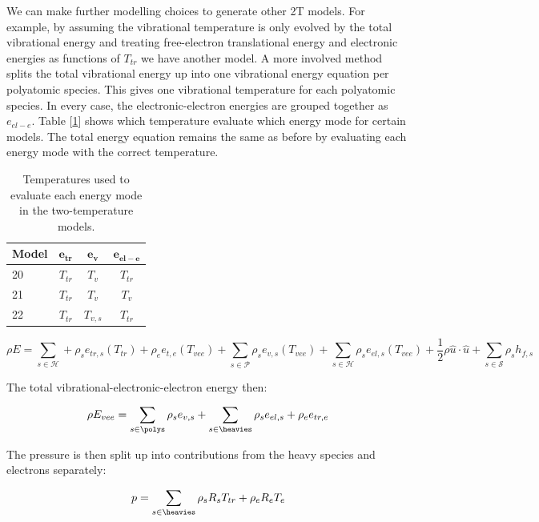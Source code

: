 \documentclass[10pt]{article}
\begin{document}
\begin{flushleft}
We can make further modelling choices to generate other 2T models. For example, by assuming the vibrational temperature is only evolved by the total vibrational energy and treating free-electron translational energy and electronic energies as functions of $T_{tr}$ we have another model. A more involved method splits the total vibrational energy up into one vibrational energy equation per polyatomic species. This gives one vibrational temperature for each polyatomic species. In every case, the electronic-electron energies are grouped together as $e_{el-e}$. Table [\ref{tab:2Tmodels}] shows which temperature evaluate which energy mode for certain models. The total energy equation remains the same as before by evaluating each energy mode with the correct temperature. 

\begin{table}[h!]
\centering
\begin{tabular}{lccc}
\toprule
\textbf{Model} & $\mathbf{e_{tr}}$ & $\mathbf{e_{v}}$ & $\mathbf{e_{el-e}}$ \\
\midrule
20 & $T_{tr}$ & $T_v$ & $T_{tr}$ \\
21 & $T_{tr}$ & $T_{v}$ & $T_{v}$ \\
22 & $T_{tr}$ & $T_{v,s}$ & $T_{tr}$ \\
\bottomrule
\end{tabular}
\caption{Temperatures used to evaluate each energy mode in the two-temperature models.}
\label{tab:2Tmodels}
\end{table}

\begin{equation*}
    \rho E = \sum_{s \in \mathcal{H}} + \rho_s e_{tr,s} (T_{tr}) + \rho_e e_{t,e} (T_{vee}) + \sum_{s \in \mathcal{P}} \rho_s e_{v,s} (T_{vee}) + \sum_{s \in \mathcal{H}} \rho_s e_{el,s} (T_{vee}) + \frac{1}{2} \rho \hat{u} \cdot \hat{u} + \sum_{s \in \mathcal{S}} \rho_s h_{f,s} 
\end{equation*}


The total vibrational-electronic-electron energy then:

\begin{equation}
    \rho E_{vee} = \sum_{s \in \polys} \rho_s e_{v,s} + \sum_{s \in \heavies} \rho_s e_{el,s} + \rho_e e_{tr,e}
\end{equation}

The pressure is then split up into contributions from the heavy species and electrons separately:

\begin{equation*}
    p = \sum_{s \in \heavies} \rho_s R_s T_{tr} + \rho_e R_e T_e
\end{equation*}


\end{flushleft}
\end{document}
